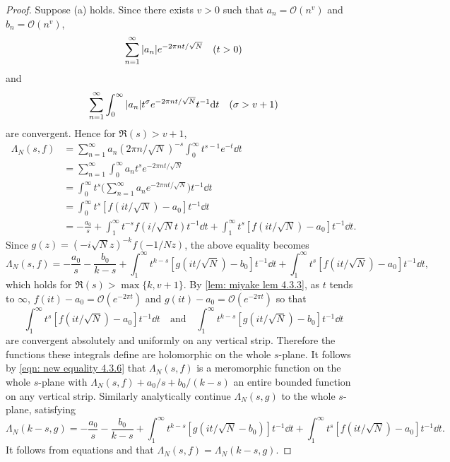 \documentclass[10pt,leqno,twoside,b5paper]{article}
\theoremstyle{plain}
\theoremstyle{definition}
\numberwithin{equation}{section}
\numberwithin{lem}{section}
\begin{document}
\begin{proof}
    Suppose (a) holds. Since there exists $v>0$ such that $a_n = \mathcal O(n^v)$ and $b_n = \mathcal O(n^v)$, 
    \[\sum_{n=1}^\infty \abs{a_n}e^{-2\pi n t/\sqrt{N}}\quad (t>0)\] and 
    \[\sum_{n=1}^\infty \int_0^\infty \abs{a_n}t^\sigma e^{-2\pi n t/\sqrt{N}}t^{-1}\dd t \quad (\sigma > v+1)\] are convergent. Hence for $\Re(s)>v+1$, 
    \begin{align*}
        \varLambda_N(s,f) &= \sum_{n=1}^\infty a_n(2\pi n/\sqrt{N})^{-s}\int_0^\infty t^{s-1}e^{-t}\dd t\\
        &= \sum_{n=1}^\infty \int_0^\infty a_nt^s e^{-2\pi n t/\sqrt{N}}\\
        &= \int_0^\infty t^s\bigg(\sum_{n=1}^\infty a_n e^{-2\pi nt /\sqrt{N}}\bigg)t^{-1}\dd t\\
        &= \int_0^\infty t^s[f(it/\sqrt{N}) - a_0]t^{-1}\dd t\\
        &= -\frac{a_0}{s} + \int_1^\infty t^{-s}f(i/\sqrt{N}t)t^{-1}\dd t + \int_1^\infty t^s[f(it/\sqrt{N}) - a_0]t^{-1}\dd t.
    \end{align*}
    Since $g(z) = (-i\sqrt{N}z)^{-k}f(-1/Nz)$, the above equality becomes 
    \begin{equation}\label{eqn: new equality 4.3.6}
        \varLambda_N(s,f) = -\frac{a_0}{s} - \frac{b_0}{k-s} + \int_1^\infty t^{k-s}[g(it/\sqrt{N})-b_0]t^{-1}\dd t + \int_1^\infty t^s[f(it/\sqrt{N}) - a_0]t^{-1}\dd t,
    \end{equation} which holds for $\Re(s)>\max\{k,v+1\}$. By \cref{lem: miyake lem 4.3.3}, as $t$ tends to $\infty$, $f(it)-a_0 = \mathcal O(e^{-2\pi t})$ and $g(it)-a_0 = \mathcal O(e^{-2\pi t})$ so that 
    \[\int_1^\infty t^s[f(it/\sqrt{N}) - a_0]t^{-1}\dd t\quad\text{and}\quad \int_1^\infty t^{k-s}[g(it/\sqrt{N})-b_0]t^{-1}\dd t\] are convergent absolutely and uniformly on any vertical strip. Therefore the functions these integrals define are holomorphic on the whole $s$-plane. It follows by \cref{eqn: new equality 4.3.6} that $\varLambda_N(s,f)$ is a meromorphic function on the whole $s$-plane with $\varLambda_N(s,f) + a_0/s+b_0/(k-s)$ an entire bounded function on any vertical strip. Similarly analytically continue $\varLambda_N(s,g)$ to the whole $s$-plane, satisfying 
    \begin{equation}\label{eqn: similar for g 4.3.6}
        \varLambda_N(k-s,g) = -\frac{a_0}{s}-\frac{b_0}{k-s} + \int_1^\infty t^{k-s}[g(it/\sqrt{N}-b_0)]t^{-1}\dd t + \int_1^\infty t^s[f(it/\sqrt{N})-a_0]t^{-1}\dd t.
    \end{equation}
    It follows from equations  and  that $\varLambda_N(s,f) = \varLambda_N(k-s,g)$.


\end{proof}
\end{document}
